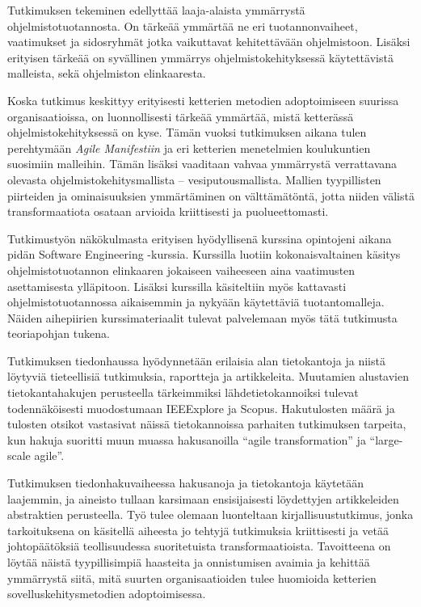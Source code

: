 Tutkimuksen tekeminen edellyttää laaja-alaista ymmärrystä
ohjelmistotuotannosta. On tärkeää ymmärtää ne eri
tuotannonvaiheet, vaatimukset ja sidosryhmät jotka vaikuttavat
kehitettävään ohjelmistoon. Lisäksi erityisen tärkeää on
syvällinen ymmärrys ohjelmistokehityksessä käytettävistä
malleista, sekä ohjelmiston elinkaaresta.

Koska tutkimus keskittyy erityisesti ketterien metodien adoptoimiseen
suurissa organisaatioissa, on luonnollisesti tärkeää ymmärtää,
mistä ketterässä ohjelmistokehityksessä on kyse. Tämän vuoksi
tutkimuksen aikana tulen perehtymään \textit{Agile Manifestiin}
ja eri ketterien menetelmien koulukuntien suosimiin malleihin.
Tämän lisäksi vaaditaan vahvaa ymmärrystä verrattavana olevasta
ohjelmistokehitysmallista – vesiputousmallista. Mallien tyypillisten
piirteiden ja ominaisuuksien ymmärtäminen on välttämätöntä, jotta
niiden välistä transformaatiota osataan arvioida kriittisesti ja
puolueettomasti.

Tutkimustyön näkökulmasta erityisen hyödyllisenä kurssina
opintojeni aikana pidän Software Engineering -kurssia. Kurssilla
luotiin kokonaisvaltainen käsitys ohjelmistotuotannon elinkaaren
jokaiseen vaiheeseen aina vaatimusten asettamisesta ylläpitoon.
Lisäksi kurssilla käsiteltiin myös kattavasti ohjelmistotuotannossa
aikaisemmin ja nykyään käytettäviä tuotantomalleja. Näiden
aihepiirien kurssimateriaalit tulevat palvelemaan myös tätä
tutkimusta teoriapohjan tukena.

Tutkimuksen tiedonhaussa hyödynnetään erilaisia alan tietokantoja
ja niistä löytyviä tieteellisiä tutkimuksia, raportteja ja
artikkeleita. Muutamien alustavien tietokantahakujen perusteella
tärkeimmiksi lähdetietokannoiksi tulevat todennäköisesti
muodostumaan IEEExplore ja Scopus. Hakutulosten määrä ja tulosten
otsikot vastasivat näissä tietokannoissa parhaiten tutkimuksen
tarpeita, kun hakuja suoritti muun muassa hakusanoilla ``agile transformation'' ja
``large-scale agile''.

Tutkimuksen tiedonhakuvaiheessa hakusanoja ja tietokantoja käytetään
laajemmin, ja aineisto tullaan karsimaan ensisijaisesti löydettyjen
artikkeleiden abstraktien perusteella. Työ tulee olemaan luonteltaan
kirjallisuustutkimus, jonka tarkoituksena on käsitellä aiheesta
jo tehtyjä tutkimuksia kriittisesti ja vetää johtopäätöksiä
teollisuudessa suoritetuista transformaatioista. Tavoitteena on
löytää näistä tyypillisimpiä haasteita ja onnistumisen avaimia ja
kehittää ymmärrystä siitä, mitä suurten organisaatioiden tulee
huomioida ketterien sovelluskehitysmetodien adoptoimisessa.
